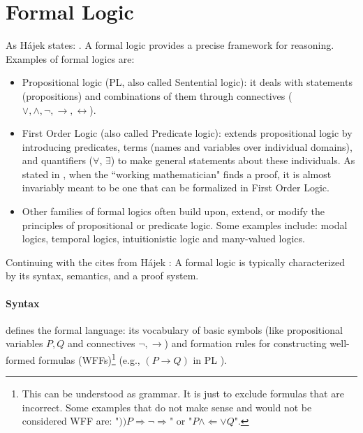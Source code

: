 \section{Formal Logic}
\label{app:form_log}

As Hájek states: \cite[p.1]{Hajek1998}. A formal logic provides a precise framework for reasoning. Examples of formal logics are:

\begin{itemize}
    \item Propositional logic (PL, also called Sentential logic)\cite[Ch.~6]{ConciseLogicBook}: it deals with statements (propositions) and combinations of them through connectives ($ \lor, \land, \neg, \rightarrow, \leftrightarrow$).
    \item First Order Logic (also called Predicate logic)\cite[Ch.~8]{ConciseLogicBook}: extends propositional logic by introducing predicates, terms (names and variables over individual domains), and quantifiers ($\forall$, $\exists$) to make general statements about these individuals. As stated in \cite[p.~67]{MathLogicBook}, when the ``working mathematician" finds a proof, it is almost invariably meant to be one that can be formalized in First Order Logic.
    \item Other families of formal logics often build upon, extend, or modify the principles of propositional or predicate logic. Some examples include: modal logics, temporal logics, intuitionistic logic and many-valued logics.
\end{itemize}

Continuing with the cites from Hájek \cite[p.1]{Hajek1998}:  A formal logic is typically characterized by its syntax, semantics, and a proof system.

\paragraph{Syntax} defines the formal language: its vocabulary of basic symbols (like propositional variables $P, Q$ and connectives $\neg, \rightarrow$) and formation rules for constructing well-formed formulas (WFFs)\footnote{This can be understood as grammar. It is just to exclude formulas that are incorrect. Some examples that do not make sense and would not be considered WFF are: "$))P\Rightarrow \neg\Rightarrow $" or "$P \land \Leftarrow \lor Q$".\cite[Sec.~2.3.3]{Agler2013SymbolicLogic}} (e.g., $(P \rightarrow Q)$ in PL \cite[Sec.~2.3.3]{Agler2013SymbolicLogic}).

